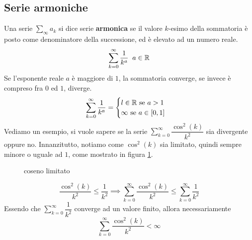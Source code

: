 \documentclass[10pt, letterpaper]{report}
\begin{document}
\subsection{Serie armoniche}
Una serie $\sum_{\infty}a_k$ si dice serie \textbf{armonica} se il valore
$k$-esimo della sommatoria è posto come denominatore della successione, ed è
elevato ad un numero reale.
$$\sum_{k=0}^\infty \dfrac{1}{k^a}\;\;a\in{\mathbb R}$$
Se l'esponente reale $a$ è maggiore di $1$, la sommatoria converge, se invece è
compreso fra $0$ ed $1$, diverge.
$$ \sum_{k=0}^\infty \dfrac{1}{k^a} = \begin{cases}
        l\in {\mathbb R}\text{ se }a>1       \\
        \infty\text{ se }a\in [0,1] \\
    \end{cases}$$
Vediamo un esempio, si vuole sapere se la serie
$\displaystyle \sum_{k=0}^\infty \dfrac{\cos^2(k)}{k^2}$
sia divergente oppure no.
Innanzitutto, notiamo come
$\cos^2(k)$ sia limitato, quindi sempre minore o uguale ad $1$, come mostrato in
figura \ref{fig:coss}.
\begin{figure}[h!]
    \centering
    \label{fig:coss}
    \caption{coseno limitato}
\end{figure}
$$\dfrac{\cos^2(k)}{k^2}\le \dfrac{1}{k^2}
    \implies
    \sum_{k=0}^\infty \dfrac{\cos^2(k)}{k^2}\le \sum_{k=0}^\infty \dfrac{1}{k^2}$$
Essendo che $\sum_{k=0}^\infty \dfrac{1}{k^2}$ converge ad un valore finito, allora
necessariamente   $$ \sum_{k=0}^\infty \dfrac{\cos^2(k)}{k^2}<\infty$$
\end{document}
